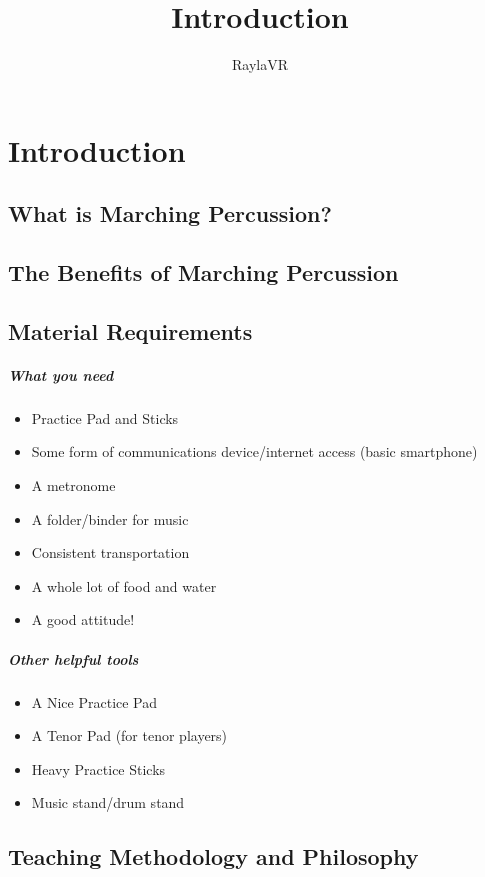 \documentclass[12pt,letterpaper]{book}
\title{Introduction}
\author{RaylaVR}
\begin{document}


\chapter{Introduction}

\section{What is Marching Percussion?}

\section{The Benefits of Marching Percussion}

\section{Material Requirements}

\paragraph{What you need}
\begin{itemize}
    \item Practice Pad and Sticks
    \item Some form of communications device/internet access (basic smartphone)
    \item A metronome
    \item A folder/binder for music
    \item Consistent transportation
    \item A whole lot of food and water
    \item A good attitude!
\end{itemize}

\paragraph{Other helpful tools}
\begin{itemize}
    \item A Nice Practice Pad
    \item A Tenor Pad (for tenor players)
    \item Heavy Practice Sticks
    \item Music stand/drum stand
\end{itemize}


\section{Teaching Methodology and Philosophy}
\end{document}
